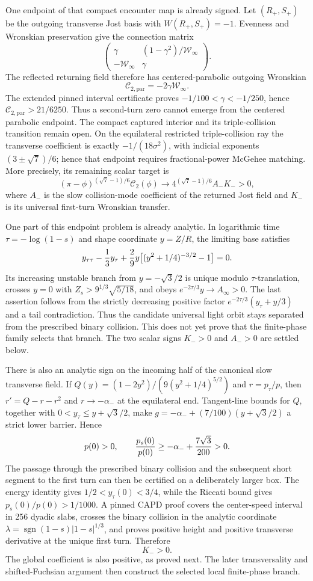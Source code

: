 \documentclass[11pt]{article}
\begin{document}
One endpoint of that compact encounter map is already signed. Let
$(R_+,S_+)$ be the outgoing transverse Jost basis with
$W(R_+,S_+)=-1$. Evenness and Wronskian preservation give the connection
matrix
\[
 \begin{pmatrix}
 \gamma&(1-\gamma^2)/\mathcal W_\infty\\
 -\mathcal W_\infty&\gamma
 \end{pmatrix}.
\]
The reflected returning field therefore has centered-parabolic outgoing
Wronskian
\[
 \mathcal C_{2,\mathrm{par}}=-2\gamma\mathcal W_\infty.
\]
The extended pinned interval certificate proves
$-1/100<\gamma<-1/250$, hence
$\mathcal C_{2,\mathrm{par}}>21/6250$. Thus a second-turn zero cannot emerge
from the centered parabolic endpoint. The compact captured interior and its
triple-collision transition remain open. On the equilateral restricted
triple-collision ray the transverse coefficient is exactly
$-1/(18\sigma^2)$, with indicial exponents $(3\pm\sqrt7)/6$; hence that
endpoint requires fractional-power McGehee matching. More precisely, its
remaining scalar target is
\[
 (\pi-\phi)^{(\sqrt7-1)/6}\mathcal C_2(\phi)
 \longrightarrow 4^{(\sqrt7-1)/6}A_-K_->0,
\]
where $A_-$ is the slow collision-mode coefficient of the returned Jost
field and $K_-$ is its universal first-turn Wronskian transfer.

One part of this endpoint problem is already analytic. In logarithmic time
$\tau=-\log(1-s)$ and shape coordinate $y=Z/R$, the limiting base satisfies
\[
 y_{\tau\tau}-{1\over3}y_\tau
 +{2\over9}y\bigl[(y^2+1/4)^{-3/2}-1\bigr]=0.
\]
Its increasing unstable branch from $y=-\sqrt3/2$ is unique modulo
$\tau$-translation, crosses $y=0$ with
$Z_s>9^{1/3}\sqrt{5/18}$, and obeys
$e^{-2\tau/3}y\to A_\infty>0$.  The last assertion follows from the
strictly decreasing positive factor
$e^{-2\tau/3}(y_\tau+y/3)$ and a tail contradiction. Thus the candidate
universal light orbit stays separated from the prescribed binary collision.
This does not yet prove that the finite-phase family selects that branch. The
two scalar signs $K_->0$ and $A_->0$ are settled below.

There is also an analytic sign on the incoming half of the canonical slow
transverse field. If
$Q(y)=(1-2y^2)/(9(y^2+1/4)^{5/2})$ and
$r=p_\tau/p$, then $r'=Q-r-r^2$ and $r\to-\alpha_-$ at the
equilateral end. Tangent-line bounds for $Q$, together with
$0<y_\tau\le y+\sqrt3/2$, make
$g=-\alpha_-+(7/100)(y+\sqrt3/2)$ a strict lower barrier. Hence
\[
 p(0)>0,\qquad {p_s(0)\over p(0)}
 \ge-\alpha_-+{7\sqrt3\over200}>0.
\]
The passage through the prescribed binary collision and the subsequent
short segment to the first turn can then be certified on a deliberately
larger box. The energy identity gives
$1/2<y_\tau(0)<3/4$, while the Riccati bound gives
$p_s(0)/p(0)>1/1000$. A pinned CAPD proof covers the center-speed interval in
256 dyadic slabs, crosses the binary collision in the analytic coordinate
$\lambda=\operatorname{sgn}(1-s)|1-s|^{1/3}$, and proves positive height and
positive transverse derivative at the unique first turn. Therefore
\[
 K_->0.
\]
The global coefficient is also positive, as proved next. The later
transversality and shifted-Fuchsian argument then construct the selected local
finite-phase branch.
\end{document}
